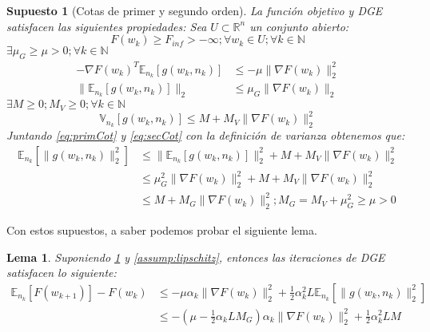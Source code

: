 \documentclass{book}
\theoremstyle{plain}
\newtheorem{lem}[thm]{Lema}
\newtheorem{assump}{Supuesto}[thm]
\theoremstyle{definition}
\theoremstyle{remark}
\begin{document}
\begin{assump}[Cotas de primer y segundo orden]\label{assump:primeSec}
La función objetivo y DGE satisfacen las siguientes propiedades: Sea $U\subset\mathbb{R}^n$ un conjunto abierto:
\begin{equation}\label{eq:cotInf}
    F(w_k)\geq F_{inf} > -\infty; \forall w_k \in U;\forall k\in\mathbb{N}
\end{equation}
$\exists \mu_G \geq \mu>0; \forall k \in \mathbb{N}$
\begin{equation}\label{eq:primCot}
\begin{split}
    -\nabla F(w_k)^T\mathbb{E}_{n_k}[g(w_k, n_k)] & \leq -\mu\|\nabla F(w_k)\|_2^2 \\
    \|\mathbb{E}_{n_k}[g(w_k, n_k)]\|_2 & \leq \mu_G\|\nabla F(w_k)\|_2
\end{split}
\end{equation}
$\exists M \geq 0;  M_V\geq0; \forall k \in \mathbb{N}$
\begin{equation}\label{eq:secCot}
    \mathbb{V}_{n_k}[g(w_k, n_k)] \leq M + M_V\|\nabla F(w_k)\|_2^2
\end{equation}
Juntando \ref{eq:primCot} y \ref{eq:secCot} con la definición de varianza obtenemos que:
\begin{equation}\label{eq:secCot1}
    \begin{split}
    \mathbb{E}_{n_k}[\|g(w_k, n_k)\|_2^2] & \leq \|\mathbb{E}_{n_k}[g(w_k, n_k)]\|_2^2 + M + M_V\|\nabla F(w_k)\|_2^2\\
    & \leq \mu_G^2\|\nabla F(w_k)\|_2^2 + M + M_V\|\nabla F(w_k)\|_2^2\\
    & \leq M + M_G\|\nabla F(w_k)\|_2^2; M_G = M_V + \mu_G^2 \geq \mu >0
    \end{split}
\end{equation}
\end{assump}

Con estos supuestos, a saber podemos probar el siguiente lema.

\begin{lem}\label{lem:desc}
Suponiendo \ref{assump:primeSec} y \ref{assump:lipschitz}, entonces las iteraciones de DGE satisfacen lo siguiente:
\begin{equation}
    \begin{split}
    \mathbb{E}_{n_k}[F(w_{k+1})] - F(w_k) & \leq -\mu\alpha_k\|\nabla F(w_k)\|^2_2 + \frac{1}{2}\alpha_k^2L\mathbb{E}_{n_k}[\|g(w_k, n_k)\|_2^2]\\
    & \leq -(\mu - \frac{1}{2}\alpha_kLM_G)\alpha_k\|\nabla F(w_k)\|_2^2 + \frac{1}{2}\alpha_k^2LM
    \end{split}
\end{equation}
\end{lem}
\end{document}
